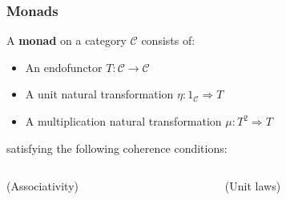 \documentclass{beamer}
\begin{document}
    \begin{frame}[fragile]
    \frametitle{Monads}
    \begin{definition}
    A \textbf{monad} on a category $\mathcal{C}$ consists of:
    \begin{itemize}
        \item An endofunctor $T: \mathcal{C} \to \mathcal{C}$
        \item A unit natural transformation $\eta: 1_{\mathcal{C}} \Rightarrow T$
        \item A multiplication natural transformation $\mu: T^2 \Rightarrow T$
    \end{itemize}
    satisfying the following coherence conditions:
    \begin{columns}
        \begin{column}{0.5\textwidth}
            \begin{center}
                (Associativity)
            \end{center}
        \end{column}
        \begin{column}{0.5\textwidth}
            \begin{center}
                (Unit laws)
            \end{center}
        \end{column}
    \end{columns}
    \end{definition}
    \end{frame}
    
\end{document}
